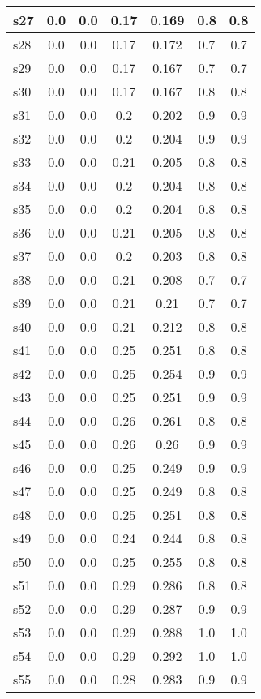 \documentclass{article}
\begin{document}
\begin{tabular}{|l|c|c|c|c|c|c|}
\hline
s27 &0.0 & 0.0 & 0.17 & 0.169 & 0.8 & 0.8\\
\hline
s28 &0.0 & 0.0 & 0.17 & 0.172 & 0.7 & 0.7\\
\hline
s29 &0.0 & 0.0 & 0.17 & 0.167 & 0.7 & 0.7\\
\hline
s30 &0.0 & 0.0 & 0.17 & 0.167 & 0.8 & 0.8\\
\hline
s31 &0.0 & 0.0 & 0.2 & 0.202 & 0.9 & 0.9\\
\hline
s32 &0.0 & 0.0 & 0.2 & 0.204 & 0.9 & 0.9\\
\hline
s33 &0.0 & 0.0 & 0.21 & 0.205 & 0.8 & 0.8\\
\hline
s34 &0.0 & 0.0 & 0.2 & 0.204 & 0.8 & 0.8\\
\hline
s35 &0.0 & 0.0 & 0.2 & 0.204 & 0.8 & 0.8\\
\hline
s36 &0.0 & 0.0 & 0.21 & 0.205 & 0.8 & 0.8\\
\hline
s37 &0.0 & 0.0 & 0.2 & 0.203 & 0.8 & 0.8\\
\hline
s38 &0.0 & 0.0 & 0.21 & 0.208 & 0.7 & 0.7\\
\hline
s39 &0.0 & 0.0 & 0.21 & 0.21 & 0.7 & 0.7\\
\hline
s40 &0.0 & 0.0 & 0.21 & 0.212 & 0.8 & 0.8\\
\hline
s41 &0.0 & 0.0 & 0.25 & 0.251 & 0.8 & 0.8\\
\hline
s42 &0.0 & 0.0 & 0.25 & 0.254 & 0.9 & 0.9\\
\hline
s43 &0.0 & 0.0 & 0.25 & 0.251 & 0.9 & 0.9\\
\hline
s44 &0.0 & 0.0 & 0.26 & 0.261 & 0.8 & 0.8\\
\hline
s45 &0.0 & 0.0 & 0.26 & 0.26 & 0.9 & 0.9\\
\hline
s46 &0.0 & 0.0 & 0.25 & 0.249 & 0.9 & 0.9\\
\hline
s47 &0.0 & 0.0 & 0.25 & 0.249 & 0.8 & 0.8\\
\hline
s48 &0.0 & 0.0 & 0.25 & 0.251 & 0.8 & 0.8\\
\hline
s49 &0.0 & 0.0 & 0.24 & 0.244 & 0.8 & 0.8\\
\hline
s50 &0.0 & 0.0 & 0.25 & 0.255 & 0.8 & 0.8\\
\hline
s51 &0.0 & 0.0 & 0.29 & 0.286 & 0.8 & 0.8\\
\hline
s52 &0.0 & 0.0 & 0.29 & 0.287 & 0.9 & 0.9\\
\hline
s53 &0.0 & 0.0 & 0.29 & 0.288 & 1.0 & 1.0\\
\hline
s54 &0.0 & 0.0 & 0.29 & 0.292 & 1.0 & 1.0\\
\hline
s55 &0.0 & 0.0 & 0.28 & 0.283 & 0.9 & 0.9\\

\end{tabular}
\end{document}
